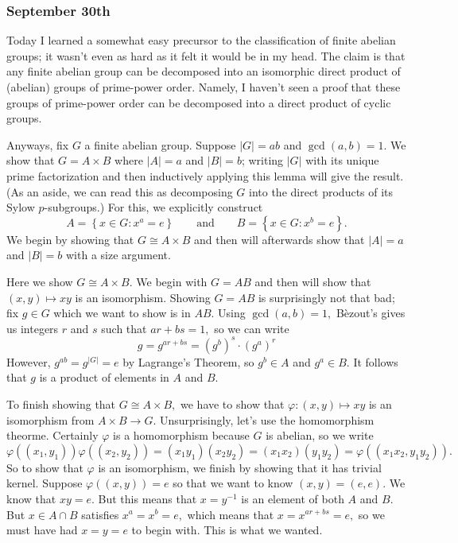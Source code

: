 \subsubsection{September 30th}
Today I learned a somewhat easy precursor to the classification of finite abelian groups; it wasn't even as hard as it felt it would be in my head. The claim is that any finite abelian group can be decomposed into an isomorphic direct product of (abelian) groups of prime-power order. Namely, I haven't seen a proof that these groups of prime-power order can be decomposed into a direct product of cyclic groups.

Anyways, fix $G$ a finite abelian group. Suppose $|G|=ab$ and $\gcd(a,b)=1.$ We show that $G=A\times B$ where $|A|=a$ and $|B|=b$; writing $|G|$ with its unique prime factorization and then inductively applying this lemma will give the result. (As an aside, we can read this as decomposing $G$ into the direct products of its Sylow $p$-subgroups.) For this, we explicitly construct
\[A=\left\{x\in G:x^a=e\right\}\qquad\text{and}\qquad B=\left\{x\in G:x^b=e\right\}.\]
We begin by showing that $G\cong A\times B$ and then will afterwards show that $|A|=a$ and $|B|=b$ with a size argument.

Here we show $G\cong A\times B.$ We begin with $G=AB$ and then will show that $(x,y)\mapsto xy$ is an isomorphism. Showing $G=AB$ is surprisingly not that bad; fix $g\in G$ which we want to show is in $AB.$ Using $\gcd(a,b)=1,$ B\`ezout's gives us integers $r$ and $s$ such that $ar+bs=1,$ so we can write
\[g=g^{ar+bs}=\left(g^b\right)^s\cdot\left(g^a\right)^r\]
However, $g^{ab}=g^{|G|}=e$ by Lagrange's Theorem, so $g^b\in A$ and $g^a\in B.$ It follows that $g$ is a product of elements in $A$ and $B.$

To finish showing that $G\cong A\times B,$ we have to show that $\varphi:(x,y)\mapsto xy$ is an isomorphism from $A\times B\to G.$ Unsurprisingly, let's use the homomorphism theorme. Certainly $\varphi$ is a homomorphism because $G$ is abelian, so we write
\[\varphi((x_1,y_1))\varphi((x_2,y_2))=(x_1y_1)(x_2y_2)=(x_1x_2)(y_1y_2)=\varphi((x_1x_2,y_1y_2)).\]
So to show that $\varphi$ is an isomorphism, we finish by showing that it has trivial kernel. Suppose $\varphi((x,y))=e$ so that we want to know $(x,y)=(e,e).$ We know that $xy=e.$ But this means that $x=y^{-1}$ is an element of both $A$ and $B.$ But $x\in A\cap B$ satisfies $x^a=x^b=e,$ which means that $x=x^{ar+bs}=e,$ so we must have had $x=y=e$ to begin with. This is what we wanted.

